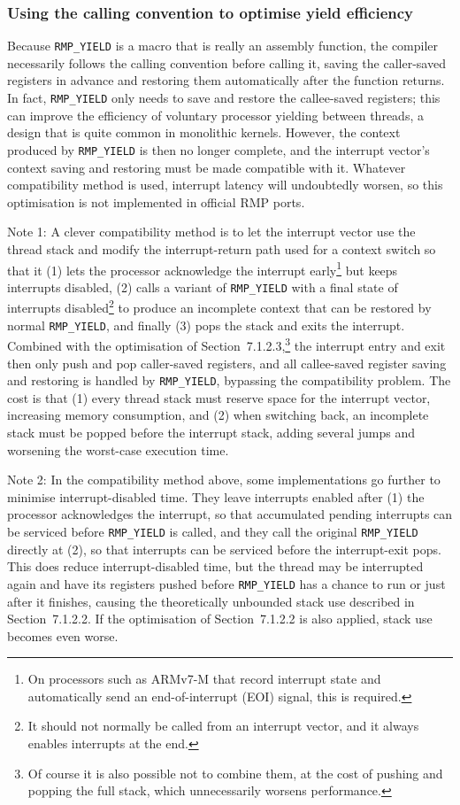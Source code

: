 \subsubsection{Using the calling convention to optimise yield efficiency}

Because \texttt{RMP\_YIELD} is a macro that is really an assembly function, the compiler necessarily follows the calling convention before calling it, saving the caller-saved registers in advance and restoring them automatically after the function returns.
In fact, \texttt{RMP\_YIELD} only needs to save and restore the callee-saved registers; this can improve the efficiency of voluntary processor yielding between threads, a design that is quite common in monolithic kernels.
However, the context produced by \texttt{RMP\_YIELD} is then no longer complete, and the interrupt vector's context saving and restoring must be made compatible with it.
Whatever compatibility method is used, interrupt latency will undoubtedly worsen, so this optimisation is not implemented in official RMP ports.

Note 1: A clever compatibility method is to let the interrupt vector use the thread stack and modify the interrupt-return path used for a context switch so that it (1) lets the processor acknowledge the interrupt early\footnote{On processors such as ARMv7-M that record interrupt state and automatically send an end-of-interrupt (EOI) signal, this is required.} but keeps interrupts disabled, (2) calls a variant of \texttt{RMP\_YIELD} with a final state of interrupts disabled\footnote{It should not normally be called from an interrupt vector, and it always enables interrupts at the end.} to produce an incomplete context that can be restored by normal \texttt{RMP\_YIELD}, and finally (3) pops the stack and exits the interrupt.
Combined with the optimisation of Section~7.1.2.3,\footnote{Of course it is also possible not to combine them, at the cost of pushing and popping the full stack, which unnecessarily worsens performance.} the interrupt entry and exit then only push and pop caller-saved registers, and all callee-saved register saving and restoring is handled by \texttt{RMP\_YIELD}, bypassing the compatibility problem.
The cost is that (1) every thread stack must reserve space for the interrupt vector, increasing memory consumption, and (2) when switching back, an incomplete stack must be popped before the interrupt stack, adding several jumps and worsening the worst-case execution time.

Note 2: In the compatibility method above, some implementations go further to minimise interrupt-disabled time.
They leave interrupts enabled after (1) the processor acknowledges the interrupt, so that accumulated pending interrupts can be serviced before \texttt{RMP\_YIELD} is called, and they call the original \texttt{RMP\_YIELD} directly at (2), so that interrupts can be serviced before the interrupt-exit pops.
This does reduce interrupt-disabled time, but the thread may be interrupted again and have its registers pushed before \texttt{RMP\_YIELD} has a chance to run or just after it finishes, causing the theoretically unbounded stack use described in Section~7.1.2.2.
If the optimisation of Section~7.1.2.2 is also applied, stack use becomes even worse.

